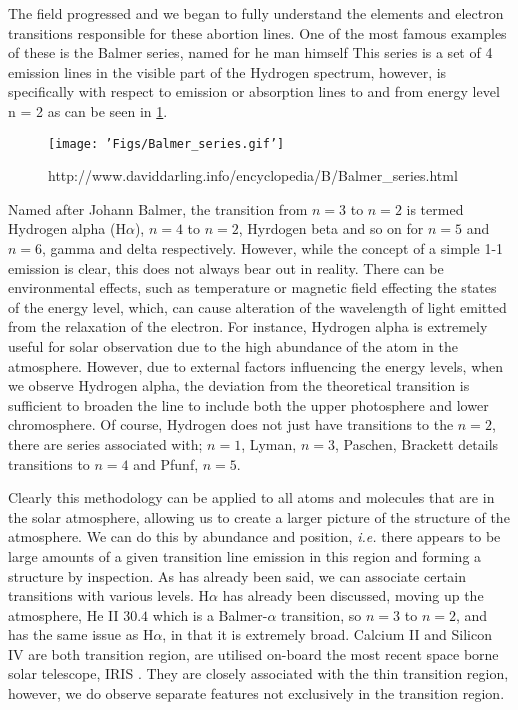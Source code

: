 The field progressed and we began to fully understand the elements and electron transitions responsible for these abortion lines.
One of the most famous examples of these is the Balmer series, named for he man himself
This series is a set of 4 emission lines in the visible part of the Hydrogen spectrum, however, is specifically with respect to emission or absorption lines to and from energy level n = 2 as can be seen in \ref{fig:balmer}.

\begin{figure}
	\texttt{[image: 'Figs/Balmer\_series.gif']}
	\caption{http://www.daviddarling.info/encyclopedia/B/Balmer_series.html}
	\label{fig:balmer}
\end{figure}

Named after Johann Balmer, the transition from $n=3$ to $n=2$ is termed Hydrogen alpha (H$\alpha$), $n=4$ to $n=2$, Hyrdogen beta and so on for $n=5$ and $n=6$, gamma and delta respectively. 
However, while the concept of a simple 1-1 emission is clear, this does not always bear out in reality.
There can be environmental effects, such as temperature or magnetic field effecting the states of the energy level, which, can cause alteration of the wavelength of light emitted from the relaxation of the electron.
For instance, Hydrogen alpha is extremely useful for solar observation due to the high abundance of the atom in the atmosphere.
However, due to external factors influencing the energy levels, when we observe Hydrogen alpha, the deviation from the theoretical transition is sufficient to broaden the line to include both the upper photosphere and lower chromosphere.
Of course, Hydrogen does not just have transitions to the $n=2$, there are series associated with; $n=1$, Lyman, $n=3$, Paschen, Brackett details transitions to $n=4$ and Pfunf, $n=5$.

Clearly this methodology can be applied to all atoms and molecules that are in the solar atmosphere, allowing us to create a larger picture of the structure of the atmosphere.
We can do this by abundance and position, \emph{i.e.} there appears to be large amounts of a given transition line emission in this region and forming a structure by inspection.
As has already been said, we can associate certain transitions with various levels.
H$\alpha$ has already been discussed, moving up the atmosphere, He II $30.4$ \cite{Bazin2010} which is a Balmer-$\alpha$ transition, so $n=3$ to $n=2$, and has the same issue as H$\alpha$, in that it is extremely broad.
Calcium II and Silicon IV are both transition region, are utilised on-board the most recent space borne solar telescope, IRIS \citep{PereiraIRIS2014}. 
They are closely associated with the thin transition region, however, we do observe separate features not exclusively in the transition region.

